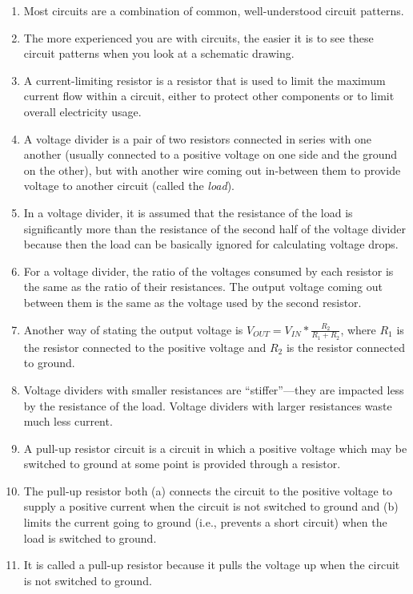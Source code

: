 \begin{enumerate}
\item Most circuits are a combination of common, well-understood circuit patterns.
\item The more experienced you are with circuits, the easier it is to see these circuit patterns when you look at a schematic drawing.
\item A current-limiting resistor is a resistor that is used to limit the maximum current flow within a circuit, either to protect other components or to limit overall electricity usage.
\item A voltage divider is a pair of two resistors connected in series with one another (usually connected to a positive voltage on one side and the ground on the other), but with another wire coming out in-between them to provide voltage to another circuit (called the \emph{load}).
\item In a voltage divider, it is assumed that the resistance of the load is significantly more than the resistance of the second half of the voltage divider because then the load can be basically ignored for calculating voltage drops.
\item For a voltage divider, the ratio of the voltages consumed by each resistor is the same as the ratio of their resistances.  The output voltage coming out between them is the same as the voltage used by the second resistor.
\item Another way of stating the output voltage is $V_{OUT} = V_{IN} * \frac{R_2}{R_1 + R_2}$, where $R_1$ is the resistor connected to the positive voltage and $R_2$ is the resistor connected to ground.
\item Voltage dividers with smaller resistances are ``stiffer''---they are impacted less by the resistance of the load.  Voltage dividers with larger resistances waste much less current.
\item A pull-up resistor circuit is a circuit in which a positive voltage which may be switched to ground at some point is provided through a resistor.
\item The pull-up resistor both (a) connects the circuit to the positive voltage to supply a positive current when the circuit is not switched to ground and (b) limits the current going to ground (i.e., prevents a short circuit) when the load is switched to ground.
\item It is called a pull-up resistor because it pulls the voltage up when the circuit is not switched to ground.
\end{enumerate}

